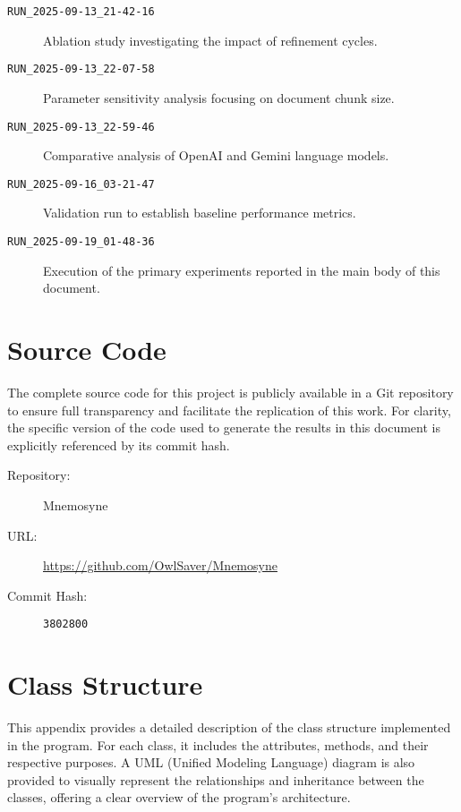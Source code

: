 \begin{description}
    \item[\texttt{RUN\_2025-09-13\_21-42-16}] Ablation study investigating the impact of refinement cycles.
    \item[\texttt{RUN\_2025-09-13\_22-07-58}] Parameter sensitivity analysis focusing on document chunk size.
    \item[\texttt{RUN\_2025-09-13\_22-59-46}] Comparative analysis of OpenAI and Gemini language models.
    \item[\texttt{RUN\_2025-09-16\_03-21-47}] Validation run to establish baseline performance metrics.
    \item[\texttt{RUN\_2025-09-19\_01-48-36}] Execution of the primary experiments reported in the main body of this document.
\end{description}

\chapter{Source Code}
\label{app:source_code}


The complete source code for this project is publicly available in a Git repository to ensure full transparency and facilitate the replication of this work. For clarity, the specific version of the code used to generate the results in this document is explicitly referenced by its commit hash.

\begin{description}
    \item[Repository:] Mnemosyne
    \item[URL:] \url{https://github.com/OwlSaver/Mnemosyne}
    \item[Commit Hash:] \texttt{3802800}
\end{description}

\chapter{Class Structure}
This appendix provides a detailed description of the class structure implemented in the program. For each class, it includes the attributes, methods, and their respective purposes. A UML (Unified Modeling Language) diagram is also provided to visually represent the relationships and inheritance between the classes, offering a clear overview of the program's architecture.

